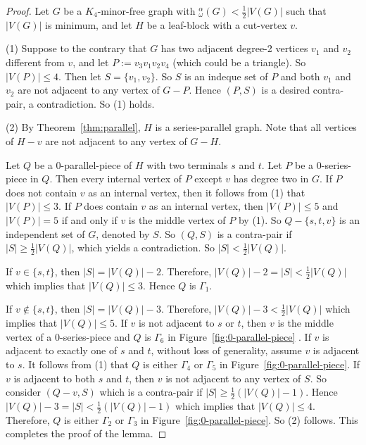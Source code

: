 \documentclass{article}
\newcommand{\idq}{{}^{\alpha}_{\omega}}
\begin{document}
\begin{proof}
Let $G$ be a $K_4$-minor-free graph with $\idq(G)<\frac 1 2 |V(G)|$ such that $|V(G)|$ is minimum, and let $H$ be a leaf-block with a cut-vertex $v$. \medskip 

(1) Suppose to the contrary that $G$ has two adjacent degree-2 vertices $v_1$ and $v_2$ different from $v$, and let $P:=v_3v_1v_2v_4$ (which could be a triangle). So $|V(P)|\le 4$. Then let $S=\{v_1,v_2\}$. So $S$ is an indeque set of $P$ and both $v_1$ and $v_2$ are not adjacent to any vertex of $G-P$. Hence $(P,S)$ is a desired contra-pair, a contradiction. So (1) holds. \medskip

(2) By Theorem~\ref{thm:parallel}, $H$ is a series-parallel graph. Note that all vertices of $H-v$ are not adjacent to any vertex of $G-H$.

Let $Q$ be a $0$-parallel-piece of $H$ with two terminals $s$ and $t$. Let $P$ be a $0$-series-piece in $Q$. Then every internal vertex of $P$ except $v$ has degree two in $G$. If $P$ does not contain $v$ as an internal vertex, then it follows from (1) that $|V(P)|\le 3$. If $P$ does contain $v$ as an internal vertex, then $|V(P)|\le 5$ and $|V(P)|=5$ if and only if $v$ is the middle vertex of $P$ by (1). So $Q-\{s,t, v\}$ is an independent set of $G$, denoted by $S$. So $(Q, S)$ is a contra-pair if $|S|\ge \frac 1 2 |V(Q)|$, which yields a contradiction. So $|S|<\frac 1 2 |V(Q)|$. 

If $v\in \{s,t\}$, then $|S|=|V(Q)|-2$. Therefore, $|V(Q)|-2=|S|<\frac 1 2 |V(Q)|$ which implies that $|V(Q)|\le 3$. Hence $Q$ is $\Gamma_1$. 

If $v\notin \{s,t\}$, then $|S|=|V(Q)|-3$. Therefore, $|V(Q)|-3<\frac 1 2 |V(Q)|$ which implies that $|V(Q)|\le 5$. If $v$ is not adjacent to $s$ or $t$, then $v$ is the middle vertex of a $0$-series-piece and $Q$ is $\Gamma_6$ in Figure~\ref{fig:0-parallel-piece} . If $v$ is adjacent to exactly one of $s$ and $t$, without loss of generality, assume $v$ is adjacent to $s$. It follows from (1) that $Q$ is either $\Gamma_4$ or $\Gamma_5$ in Figure~\ref{fig:0-parallel-piece}.  If $v$ is adjacent to both $s$ and $t$, then $v$ is not adjacent to any vertex of $S$. So consider $(Q-v, S)$ which is a contra-pair if $|S|\ge \frac 1 2 (|V(Q)|-1)$. Hence $|V(Q)|-3=|S|<\frac 1 2 (|V(Q)|-1)$ which implies that $|V(Q)|\le 4$. Therefore, $Q$ is either $\Gamma_2$ or $ \Gamma_3 $ in Figure~\ref{fig:0-parallel-piece}. So (2) follows. This completes the proof of the lemma. 
\end{proof}
\end{document}
